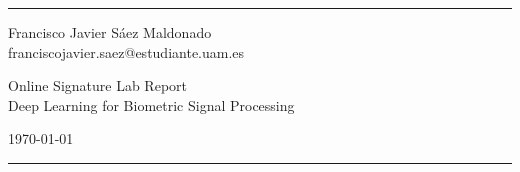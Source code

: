 \documentclass[a4paper]{article}
\begin{document}

\fancyhead[C]{}
\hrule \medskip %
\begin{minipage}{0.295\textwidth}
  \raggedright
  \footnotesize
  Francisco Javier Sáez Maldonado \hfill\\
  franciscojavier.saez@estudiante.uam.es
  \hfill\\
\end{minipage}
\begin{minipage}{0.4\textwidth}
  \centering
  \large
  Online Signature Lab Report\\
  \normalsize
  Deep Learning for Biometric Signal Processing\\
\end{minipage}
\begin{minipage}{0.295\textwidth}
  \raggedleft
  \today\hfill\\
\end{minipage}
\medskip\hrule

\end{document}
